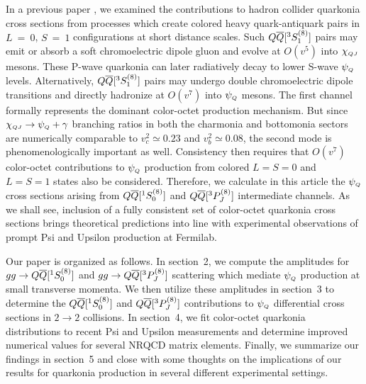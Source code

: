 	In a previous paper \ChoLeibov, we examined the contributions to 
hadron collider quarkonia cross sections from processes which create colored 
heavy quark-antiquark pairs in $L~=~0$, $S~=~1$ configurations at short 
distance scales.  Such $Q{\overline Q}[ ^3S_1^{(8)}]$ pairs may emit or absorb a soft 
chromoelectric dipole gluon and evolve at $O(v^5)$ into $\chi_{{\scriptscriptstyle Q}{\scriptscriptstyle J}}$ mesons.  
These P-wave quarkonia can later radiatively decay to lower S-wave $\psi_{\scriptscriptstyle Q}$ 
levels.  Alternatively, $Q{\overline Q}[ ^3S_1^{(8)}]$ pairs may undergo double 
chromoelectric dipole transitions and directly hadronize at $O(v^7)$ into 
$\psi_{\scriptscriptstyle Q}$ mesons.   The first channel formally 
represents the dominant color-octet production mechanism.  But since 
$\chi_{{\scriptscriptstyle Q}{\scriptscriptstyle J}} \to \psi_{\scriptscriptstyle Q} + \gamma$ branching ratios in both the charmonia and 
bottomonia sectors are numerically comparable to $v_c^2 \simeq 0.23$ and $v_b^2 
\simeq 0.08$, the second mode is phenomenologically important as well.  
Consistency then requires that $O(v^7)$ color-octet contributions to $\psi_{\scriptscriptstyle Q}$ 
production from colored $L=S=0$ and $L=S=1$ states also be considered.  
Therefore, we calculate in this article the $\psi_{\scriptscriptstyle Q}$ cross sections arising from 
$Q{\overline Q}[ ^1S_0^{(8)}]$ and $Q{\overline Q}[ ^3P_J^{(8)}]$ intermediate channels.   As we shall 
see, inclusion of a fully consistent set of color-octet quarkonia cross 
sections brings theoretical predictions into line with experimental 
observations of prompt Psi and Upsilon production at Fermilab.

	Our paper is organized as follows.  In section~2, we compute the 
amplitudes for $gg \to Q{\overline Q}[ ^1S_0^{(8)}]$ and $gg \to Q{\overline Q}[ ^3P_J^{(8)}]$ 
scattering which mediate $\psi_{\scriptscriptstyle Q}$ production at small transverse momenta.  We 
then utilize these amplitudes in section~3 to determine the $Q{\overline Q}[ ^1S_0^{(8)}]$ 
and $Q{\overline Q}[ ^3P_J^{(8)}]$ contributions to $\psi_{\scriptscriptstyle Q}$ differential cross sections 
in $2 \to 2$ collisions.  In section~4, we fit color-octet quarkonia 
distributions to recent Psi and Upsilon measurements and determine improved 
numerical values for several NRQCD matrix elements.  Finally, we summarize our 
findings in section~5 and close with some thoughts on the implications of our 
results for quarkonia production in several different experimental settings.


